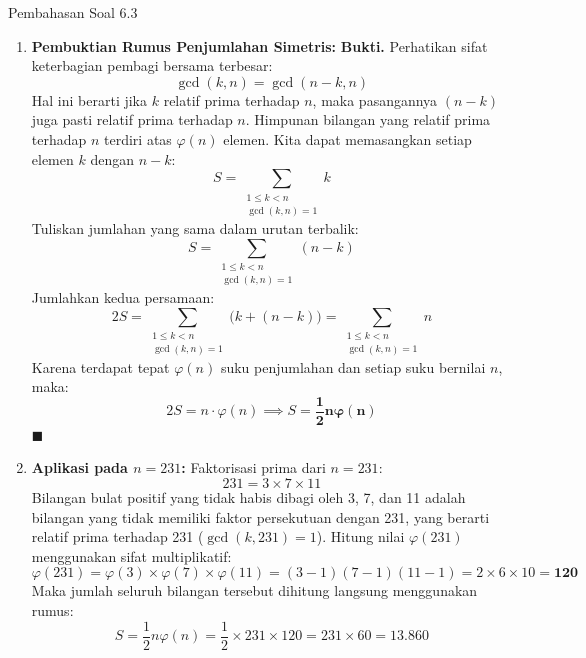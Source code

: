 \documentclass[11pt,a4paper]{article}
\newenvironment{proof}{\noindent\textbf{Bukti.}}{\hfill$\blacksquare$\vspace{0.3em}}
\begin{document}
\begin{solusibox}{Pembahasan Soal 6.3}
\begin{enumerate}[leftmargin=*]
    \item \textbf{Pembuktian Rumus Penjumlahan Simetris:}
    \begin{proof}
    Perhatikan sifat keterbagian pembagi bersama terbesar:
    \[
    \gcd(k, n) = \gcd(n - k, n)
    \]
    Hal ini berarti jika $k$ relatif prima terhadap $n$, maka pasangannya $(n - k)$ juga pasti relatif prima terhadap $n$.
    Himpunan bilangan yang relatif prima terhadap $n$ terdiri atas $\varphi(n)$ elemen.
    Kita dapat memasangkan setiap elemen $k$ dengan $n - k$:
    \[
    S = \sum_{\substack{1 \le k < n \\ \gcd(k, n) = 1}} k
    \]
    Tuliskan jumlahan yang sama dalam urutan terbalik:
    \[
    S = \sum_{\substack{1 \le k < n \\ \gcd(k, n) = 1}} (n - k)
    \]
    Jumlahkan kedua persamaan:
    \[
    2S = \sum_{\substack{1 \le k < n \\ \gcd(k, n) = 1}} \big(k + (n - k)\big) = \sum_{\substack{1 \le k < n \\ \gcd(k, n) = 1}} n
    \]
    Karena terdapat tepat $\varphi(n)$ suku penjumlahan dan setiap suku bernilai $n$, maka:
    \[
    2S = n \cdot \varphi(n) \implies S = \mathbf{\frac{1}{2} n \varphi(n)}
    \]
    \end{proof}
    \item \textbf{Aplikasi pada $n = 231$:}
    Faktorisasi prima dari $n = 231$:
    \[
    231 = 3 \times 7 \times 11
    \]
    Bilangan bulat positif yang tidak habis dibagi oleh 3, 7, dan 11 adalah bilangan yang tidak memiliki faktor persekutuan dengan 231, yang berarti relatif prima terhadap 231 ($\gcd(k, 231) = 1$).
    Hitung nilai $\varphi(231)$ menggunakan sifat multiplikatif:
    \[
    \varphi(231) = \varphi(3) \times \varphi(7) \times \varphi(11) = (3 - 1)(7 - 1)(11 - 1) = 2 \times 6 \times 10 = \mathbf{120}
    \]
    Maka jumlah seluruh bilangan tersebut dihitung langsung menggunakan rumus:
    \[
    S = \frac{1}{2} n \varphi(n) = \frac{1}{2} \times 231 \times 120 = 231 \times 60 = \mathbf{13.860}
    \]
\end{enumerate}
\end{solusibox}
\end{document}
